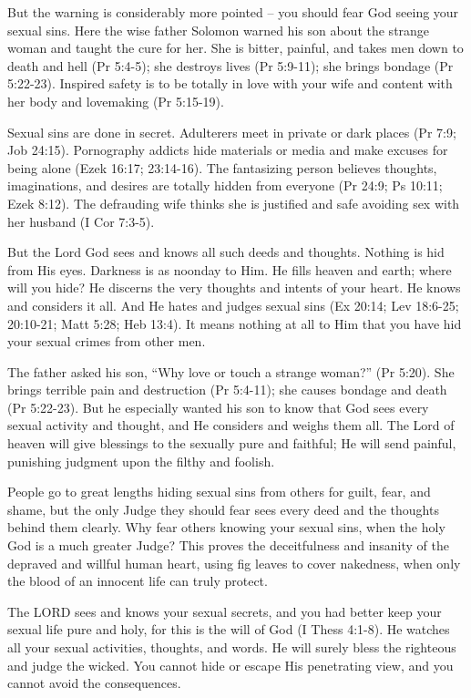 But the warning is considerably more pointed – you should fear God seeing your sexual sins. Here the wise father Solomon warned his son about the strange woman and taught the cure for her. She is bitter, painful, and takes men down to death and hell (Pr 5:4-5); she destroys lives (Pr 5:9-11); she brings bondage (Pr 5:22-23). Inspired safety is to be totally in love with your wife and content with her body and lovemaking (Pr 5:15-19).

Sexual sins are done in secret. Adulterers meet in private or dark places (Pr 7:9; Job 24:15). Pornography addicts hide materials or media and make excuses for being alone (Ezek 16:17; 23:14-16). The fantasizing person believes thoughts, imaginations, and desires are totally hidden from everyone (Pr 24:9; Ps 10:11; Ezek 8:12). The defrauding wife thinks she is justified and safe avoiding sex with her husband (I Cor 7:3-5).

But the Lord God sees and knows all such deeds and thoughts. Nothing is hid from His eyes. Darkness is as noonday to Him. He fills heaven and earth; where will you hide? He discerns the very thoughts and intents of your heart. He knows and considers it all. And He hates and judges sexual sins (Ex 20:14; Lev 18:6-25; 20:10-21; Matt 5:28; Heb 13:4). It means nothing at all to Him that you have hid your sexual crimes from other men.

The father asked his son, “Why love or touch a strange woman?” (Pr 5:20). She brings terrible pain and destruction (Pr 5:4-11); she causes bondage and death (Pr 5:22-23). But he especially wanted his son to know that God sees every sexual activity and thought, and He considers and weighs them all. The Lord of heaven will give blessings to the sexually pure and faithful; He will send painful, punishing judgment upon the filthy and foolish.

People go to great lengths hiding sexual sins from others for guilt, fear, and shame, but the only Judge they should fear sees every deed and the thoughts behind them clearly. Why fear others knowing your sexual sins, when the holy God is a much greater Judge? This proves the deceitfulness and insanity of the depraved and willful human heart, using fig leaves to cover nakedness, when only the blood of an innocent life can truly protect. 

The LORD sees and knows your sexual secrets, and you had better keep your sexual life pure and holy, for this is the will of God (I Thess 4:1-8). He watches all your sexual activities, thoughts, and words. He will surely bless the righteous and judge the wicked. You cannot hide or escape His penetrating view, and you cannot avoid the consequences.

